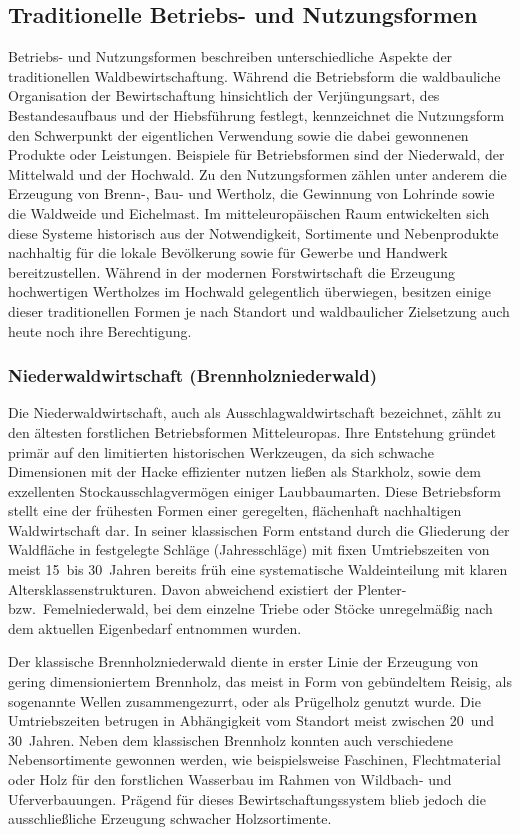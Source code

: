 \documentclass[twocolumn, bibliography=totoc, abstract=true]{scrartcl}
\begin{document}
\subsection{Traditionelle Betriebs- und Nutzungsformen}

Betriebs- und Nutzungsformen beschreiben unterschiedliche Aspekte der traditionellen Waldbewirtschaftung. Während die Betriebsform die waldbauliche Organisation der Bewirtschaftung hinsichtlich der Verjüngungsart, des Bestandesaufbaus und der Hiebsführung festlegt, kennzeichnet die Nutzungsform den Schwerpunkt der eigentlichen Verwendung sowie die dabei gewonnenen Produkte oder Leistungen. Beispiele für Betriebsformen sind der Niederwald, der Mittelwald und der Hochwald. Zu den Nutzungsformen zählen unter anderem die Erzeugung von Brenn-, Bau- und Wertholz, die Gewinnung von Lohrinde sowie die Waldweide und Eichelmast. Im mitteleuropäischen Raum entwickelten sich diese Systeme historisch aus der Notwendigkeit, Sortimente und Nebenprodukte nachhaltig für die lokale Bevölkerung sowie für Gewerbe und Handwerk bereitzustellen. Während in der modernen Forstwirtschaft die Erzeugung hochwertigen Wertholzes im Hochwald gelegentlich überwiegen, besitzen einige dieser traditionellen Formen je nach Standort und waldbaulicher Zielsetzung auch heute noch ihre Berechtigung.

\subsubsection{Niederwaldwirtschaft (Brennholzniederwald)}

Die Niederwaldwirtschaft, auch als Ausschlagwaldwirtschaft bezeichnet, zählt zu den ältesten forstlichen Betriebsformen Mitteleuropas. Ihre Entstehung gründet primär auf den limitierten historischen Werkzeugen, da sich schwache Dimensionen mit der Hacke effizienter nutzen ließen als Starkholz, sowie dem exzellenten Stockausschlagvermögen einiger Laubbaumarten. Diese Betriebsform stellt eine der frühesten Formen einer geregelten, flächenhaft nachhaltigen Waldwirtschaft dar. In seiner klassischen Form entstand durch die Gliederung der Waldfläche in festgelegte Schläge (Jahresschläge) mit fixen Umtriebszeiten von meist 15~bis 30~Jahren bereits früh eine systematische Waldeinteilung mit klaren Altersklassenstrukturen. Davon abweichend existiert der Plenter- bzw.\ Femelniederwald, bei dem einzelne Triebe oder Stöcke unregelmäßig nach dem aktuellen Eigenbedarf entnommen wurden.

Der klassische Brennholzniederwald diente in erster Linie der Erzeugung von gering dimensioniertem Brennholz, das meist in Form von gebündeltem Reisig, als sogenannte Wellen zusammengezurrt, oder als Prügelholz genutzt wurde. Die Umtriebszeiten betrugen in Abhängigkeit vom Standort meist zwischen 20~und 30~Jahren. Neben dem klassischen Brennholz konnten auch verschiedene Nebensortimente gewonnen werden, wie beispielsweise Faschinen, Flechtmaterial oder Holz für den forstlichen Wasserbau im Rahmen von Wildbach- und Uferverbauungen. Prägend für dieses Bewirtschaftungssystem blieb jedoch die ausschließliche Erzeugung schwacher Holzsortimente.
\end{document}
